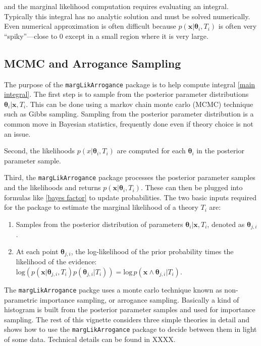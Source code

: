 \documentclass[letterpaper,12pt]{article}
\newcommand{\bx}{\boldsymbol x}
\newcommand{\btheta}{\boldsymbol \theta}%
\begin{document}
\noindent and the marginal likelihood computation requires evaluating an
integral.  Typically this integral has no analytic solution and must
be solved numerically.  Even numerical approximation is often
difficult because $p(\bx|\btheta_i, T_i)$ is often very
``spiky''---close to 0 except in a small region where it is very large.

\subsection{MCMC and Arrogance Sampling}

The purpose of the \texttt{margLikArrogance} package is to help
compute integral \eqref{main integral}.  The first step is to sample
from the posterior parameter distributions $\btheta_i|\bx, T_i$.  This
can be done using a markov chain monte carlo (MCMC) technique such as
Gibbs sampling.  Sampling from the posterior parameter distribution is
a common move in Bayesian statistics, frequently done even if theory
choice is not an issue.

Second, the likelihoods $p(x|\btheta_i, T_i)$ are computed for each
$\btheta_i$ in the posterior parameter sample.

Third, the \texttt{margLikArrogance} package processes the posterior
parameter samples and the likelihoods and returns $p(\bx|\btheta_i,
T_i)$.  These can then be plugged into formulas like \eqref{bayes
  factor} to update probabilities.  The two basic inputs required for
the package to estimate the marginal likelihood of a theory $T_i$ are:

\begin{enumerate}
 \item Samples from the posterior distribution of parameters
   $\btheta_i|\bx, T_i$, denoted as $\btheta_{j,i}$.
 \item At each point $\btheta_{j,i}$, the log-likelihood of the prior
   probability times the likelihood of the evidence: $\mbox{log}(p(\bx |
   \btheta_{j,i}, T_i)p(\btheta_{j,i}|T_i)) = \mbox{log}\, p(\bx \wedge \btheta_{j,i}|T_i)$.
\end{enumerate}


The \texttt{margLikArrogance} packge uses a monte carlo technique
known as non-parametric importance sampling, or arrogance sampling.
Basically a kind of histogram is built from the posterior parameter
samples and used for importance sampling.  The rest of this vignette
considers three simple theories in detail and shows how to use the
\texttt{margLikArrogance} package to decide between them in light of
some data.  Technical details can be found in XXXX.
\end{document}
